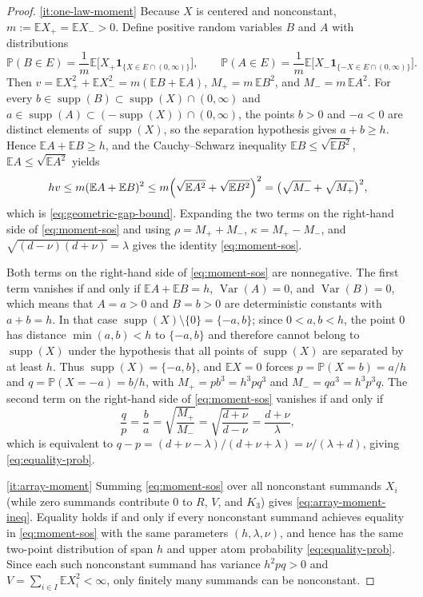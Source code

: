 \documentclass[11pt]{article}
\numberwithin{equation}{section}
\theoremstyle{definition}
\theoremstyle{remark}
\DeclareMathOperator{\Var}{Var}
\DeclareMathOperator{\supp}{supp}
\newcommand{\E}{\mathbb E}
\newcommand{\Pp}{\mathbb P}
\newcommand{\ind}{\mathbf1}
\begin{document}
\begin{proof}
\ref{it:one-law-moment} Because $X$ is centered and nonconstant,
$m:=\E X_+=\E X_->0$. Define positive random variables $B$ and $A$ with
distributions
\[
 \Pp(B\in E)=\frac{1}{m}\E\bigl[X_+\ind_{\{X\in E\cap(0,\infty)\}}\bigr],\qquad
 \Pp(A\in E)=\frac{1}{m}\E\bigl[X_-\ind_{\{-X\in E\cap(0,\infty)\}}\bigr].
\]
Then $v=\E X_+^2+\E X_-^2=m(\E B+\E A)$, $M_+=m\,\E B^2$, and
$M_-=m\,\E A^2$. For every $b\in\supp(B)\subset\supp(X)\cap(0,\infty)$ and
$a\in\supp(A)\subset(-\supp(X))\cap(0,\infty)$, the points $b>0$ and $-a<0$
are distinct elements of $\supp(X)$, so the separation hypothesis gives
$a+b\ge h$. Hence $\E A+\E B\ge h$, and the Cauchy--Schwarz inequality
$\E B\le\sqrt{\E B^2}$, $\E A\le\sqrt{\E A^2}$ yields
\[
 hv\le m(\E A+\E B)^2
 \le m\Bigl(\sqrt{\E A^2}+\sqrt{\E B^2}\Bigr)^2
 =\bigl(\sqrt{M_-}+\sqrt{M_+}\bigr)^2,
\]
which is \eqref{eq:geometric-gap-bound}. Expanding the two terms on the
right-hand side of \eqref{eq:moment-sos} and using $\rho=M_++M_-$,
$\kappa=M_+-M_-$, and $\sqrt{(d-\nu)(d+\nu)}=\lambda$ gives the identity
\eqref{eq:moment-sos}.

Both terms on the right-hand side of \eqref{eq:moment-sos} are nonnegative.
The first term vanishes if and only if $\E A+\E B=h$, $\Var(A)=0$, and
$\Var(B)=0$, which means that $A=a>0$ and $B=b>0$ are deterministic constants
with $a+b=h$. In that case $\supp(X)\setminus\{0\}=\{-a,b\}$; since $0<a,b<h$,
the point $0$ has distance $\min(a,b)<h$ to $\{-a,b\}$ and therefore cannot
belong to $\supp(X)$ under the hypothesis that all points of $\supp(X)$ are
separated by at least $h$. Thus $\supp(X)=\{-a,b\}$, and $\E X=0$ forces
$p=\Pp(X=b)=a/h$ and $q=\Pp(X=-a)=b/h$, with $M_+=p b^3=h^3pq^3$ and
$M_-=q a^3=h^3p^3q$. The second term on the right-hand side of
\eqref{eq:moment-sos} vanishes if and only if
\[
 \frac{q}{p}=\frac{b}{a}=\sqrt{\frac{M_+}{M_-}}
 =\sqrt{\frac{d+\nu}{d-\nu}}=\frac{d+\nu}{\lambda},
\]
which is equivalent to $q-p=(d+\nu-\lambda)/(d+\nu+\lambda)=\nu/(\lambda+d)$,
giving \eqref{eq:equality-prob}.

\ref{it:array-moment} Summing \eqref{eq:moment-sos} over all nonconstant
summands $X_i$ (while zero summands contribute $0$ to $R$, $V$, and $K_3$)
gives \eqref{eq:array-moment-ineq}. Equality holds if and only if every
nonconstant summand achieves equality in \eqref{eq:moment-sos} with the same
parameters $(h,\lambda,\nu)$, and hence has the same two-point distribution
of span $h$ and upper atom probability \eqref{eq:equality-prob}. Since each
such nonconstant summand has variance $h^2pq>0$ and $V=\sum_{i\in I}\E X_i^2<\infty$,
only finitely many summands can be nonconstant.
\end{proof}
\end{document}
